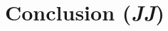 \documentclass[conf]{new-aiaa}
\begin{document}
\section{Conclusion (\textit{JJ})}
\label{section: Conclusion}



% 

\newpage

\end{document}
